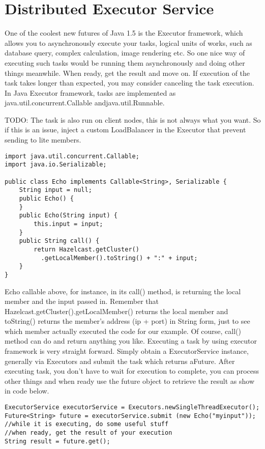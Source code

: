 \chapter{Distributed Executor Service}

One of the coolest new futures of Java 1.5 is the Executor framework, which allows you to asynchronously execute your tasks, logical units of works, such as database query, complex calculation, image rendering etc. So one nice way of executing such tasks would be running them asynchronously and doing other things meanwhile. When ready, get the result and move on. If execution of the task takes longer than expected, you may consider canceling the task execution. In Java Executor framework, tasks are implemented as java.util.concurrent.Callable andjava.util.Runnable.

TODO: The task is also run on client nodes, this is not always what you want. So if this is an issue, inject a custom LoadBalancer in the Executor that prevent sending to lite members.

\begin{verbatim}
import java.util.concurrent.Callable;
import java.io.Serializable;

public class Echo implements Callable<String>, Serializable {
    String input = null;
    public Echo() {
    }
    public Echo(String input) {
        this.input = input;
    }
    public String call() {
        return Hazelcast.getCluster()
          .getLocalMember().toString() + ":" + input;
    }
}
\end{verbatim}

Echo callable above, for instance, in its call() method, is returning the local member and the input passed in. Remember that Hazelcast.getCluster().getLocalMember() returns the local member and toString() returns the member's address (ip + port) in String form, just to see which member actually executed the code for our example. Of course, call() method can do and return anything you like. Executing a task by using executor framework is very straight forward. Simply obtain a ExecutorService instance, generally via Executors and submit the task which returns aFuture. After executing task, you don't have to wait for execution to complete, you can process other things and when ready use the future object to retrieve the result as show in code below.

\begin{verbatim}
ExecutorService executorService = Executors.newSingleThreadExecutor();
Future<String> future = executorService.submit (new Echo("myinput"));
//while it is executing, do some useful stuff
//when ready, get the result of your execution
String result = future.get();
\end{verbatim}

